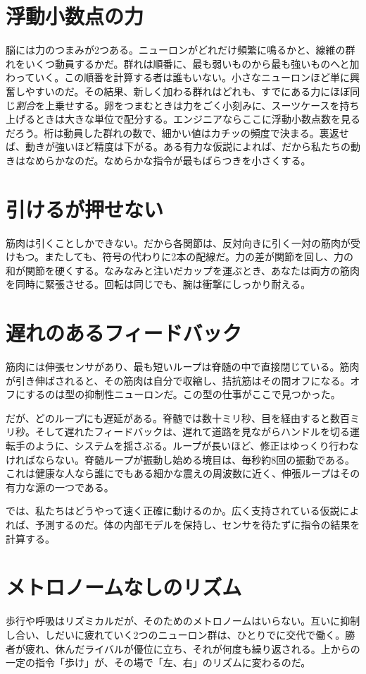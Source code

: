 \section*{浮動小数点の力}

脳には力のつまみが2つある。ニューロンがどれだけ頻繁に鳴るかと、線維の群れをいくつ動員するかだ。群れは順番に、最も弱いものから最も強いものへと加わっていく。この順番を計算する者は誰もいない。小さなニューロンほど単に興奮しやすいのだ。その結果、新しく加わる群れはどれも、すでにある力にほぼ同じ\emph{割合}を上乗せする。卵をつまむときは力をごく小刻みに、スーツケースを持ち上げるときは大きな単位で配分する。エンジニアならここに浮動小数点数を見るだろう。桁は動員した群れの数で、細かい値はカチッの頻度で決まる。裏返せば、動きが強いほど精度は下がる。ある有力な仮説によれば、だから私たちの動きはなめらかなのだ。なめらかな指令が最もばらつきを小さくする。

\section*{引けるが押せない}

筋肉は引くことしかできない。だから各関節は、反対向きに引く一対の筋肉が受けもつ。またしても、符号の代わりに2本の配線だ。力の差が関節を回し、力の和が関節を硬くする。なみなみと注いだカップを運ぶとき、あなたは両方の筋肉を同時に緊張させる。回転は同じでも、腕は衝撃にしっかり耐える。


\section*{遅れのあるフィードバック}

筋肉には伸張センサがあり、最も短いループは脊髄の中で直接閉じている。筋肉が引き伸ばされると、その筋肉は自分で収縮し、拮抗筋はその間オフになる。オフにするのは型の抑制性ニューロンだ。この型の仕事がここで見つかった。

だが、どのループにも遅延がある。脊髄では数十ミリ秒、目を経由すると数百ミリ秒。そして遅れたフィードバックは、遅れて道路を見ながらハンドルを切る運転手のように、システムを揺さぶる。ループが長いほど、修正はゆっくり行わなければならない。脊髄ループが振動し始める境目は、毎秒約8回の振動である。これは健康な人なら誰にでもある細かな震えの周波数に近く、伸張ループはその有力な源の一つである。

では、私たちはどうやって速く正確に動けるのか。広く支持されている仮説によれば、予測するのだ。体の内部モデルを保持し、センサを待たずに指令の結果を計算する。

\section*{メトロノームなしのリズム}

歩行や呼吸はリズミカルだが、そのためのメトロノームはいらない。互いに抑制し合い、しだいに疲れていく2つのニューロン群は、ひとりでに交代で働く。勝者が疲れ、休んだライバルが優位に立ち、それが何度も繰り返される。上からの一定の指令「歩け」が、その場で「左、右」のリズムに変わるのだ。

